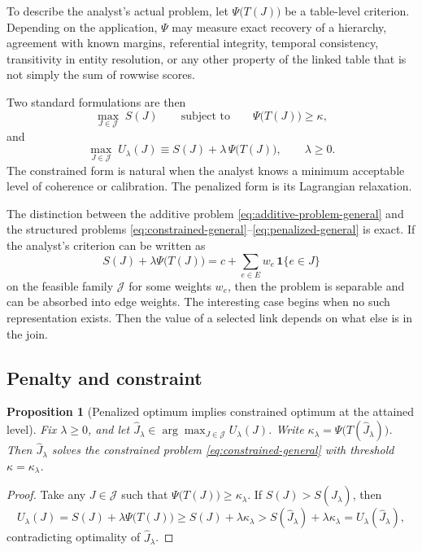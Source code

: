 \documentclass[11pt]{article}
\newtheorem{proposition}{Proposition}[section]
\theoremstyle{remark}
\begin{document}
To describe the analyst's actual problem, let $\Psi\bigl(T(J)\bigr)$ be a table-level criterion. Depending on the application, $\Psi$ may measure exact recovery of a hierarchy, agreement with known margins, referential integrity, temporal consistency, transitivity in entity resolution, or any other property of the linked table that is not simply the sum of rowwise scores.

Two standard formulations are then
\begin{equation}
\max_{J\in\mathcal{J}}\; S(J)
\qquad\text{subject to}\qquad
\Psi\bigl(T(J)\bigr)\ge \kappa,
\label{eq:constrained-general}
\end{equation}
and
\begin{equation}
\max_{J\in\mathcal{J}}\; U_\lambda(J)
\equiv
S(J)+\lambda\,\Psi\bigl(T(J)\bigr),
\qquad \lambda\ge 0.
\label{eq:penalized-general}
\end{equation}
The constrained form is natural when the analyst knows a minimum acceptable level of coherence or calibration. The penalized form is its Lagrangian relaxation.

The distinction between the additive problem \eqref{eq:additive-problem-general} and the structured problems \eqref{eq:constrained-general}--\eqref{eq:penalized-general} is exact. If the analyst's criterion can be written as
\[
S(J)+\lambda\Psi\bigl(T(J)\bigr)=c+\sum_{e\in E} w_e\,\mathbf{1}\{e\in J\}
\]
on the feasible family $\mathcal{J}$ for some weights $w_e$, then the problem is separable and can be absorbed into edge weights. The interesting case begins when no such representation exists. Then the value of a selected link depends on what else is in the join.

\subsection{Penalty and constraint}

\begin{proposition}[Penalized optimum implies constrained optimum at the attained level]
\label{prop:lgr-general}
Fix $\lambda\ge 0$, and let $\hat J_\lambda\in\arg\max_{J\in\mathcal{J}} U_\lambda(J)$. Write $\kappa_\lambda=\Psi\bigl(T(\hat J_\lambda)\bigr)$. Then $\hat J_\lambda$ solves the constrained problem \eqref{eq:constrained-general} with threshold $\kappa=\kappa_\lambda$.
\end{proposition}

\begin{proof}
Take any $J\in\mathcal{J}$ such that $\Psi\bigl(T(J)\bigr)\ge \kappa_\lambda$. If $S(J)>S(\hat J_\lambda)$, then
\[
U_\lambda(J)
=
S(J)+\lambda\Psi\bigl(T(J)\bigr)
\ge
S(J)+\lambda\kappa_\lambda
>
S(\hat J_\lambda)+\lambda\kappa_\lambda
=
U_\lambda(\hat J_\lambda),
\]
contradicting optimality of $\hat J_\lambda$.
\end{proof}
\end{document}
